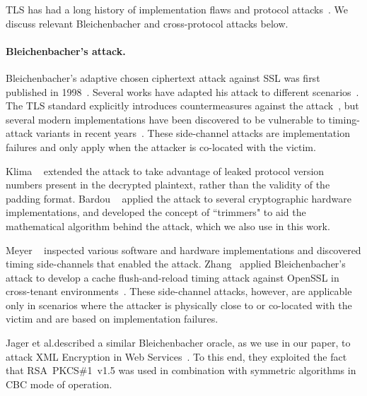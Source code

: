 TLS has had a long history of implementation flaws and protocol attacks~\cite{POODLE,CRIME,RC4biases,Lucky13,BEAST,SLOTH,Durumeric:2014:MH:2663716.2663755}. We discuss relevant Bleichenbacher and cross-protocol attacks below.

\paragraph{Bleichenbacher's attack.}
Bleichenbacher's adaptive chosen ciphertext attack against SSL was first published in 1998~\cite{Bleichenbacher}. Several works have adapted his attack to different scenarios~\cite{klima2003attacking,efficient-padding-oracle-2012,Jager2012}.
The TLS standard explicitly introduces countermeasures against the attack~\cite{rfc5246}, but several modern implementations have been discovered to be vulnerable to timing-attack variants in recent years~\cite{Meyer14,Zhang:2014:CSA:2660267.2660356}. These side-channel attacks are implementation failures and only apply when the attacker is co-located with the victim.

\ifext
Klima \etal~\cite{klima2003attacking} extended the attack to take advantage of leaked protocol version numbers present in the decrypted plaintext, rather than the validity of the padding format.  Bardou \etal~\cite{efficient-padding-oracle-2012} applied the attack to several cryptographic hardware implementations, and developed the concept of ``trimmers" to aid the mathematical algorithm behind the attack, which we also use in this work.
\fi

Meyer \etal~\cite{Meyer14} inspected various software and hardware implementations and discovered timing side-channels that enabled the attack. Zhang  \etal~applied Bleichenbacher's attack to develop a cache flush-and-reload timing attack against OpenSSL in cross-tenant environments~\cite{Zhang:2014:CSA:2660267.2660356}. These side-channel attacks, however, are applicable only in scenarios where the attacker is physically close to or co-located with the victim and are based on implementation failures.

Jager et al.\@ described a similar Bleichenbacher oracle, as we use in our paper, to attack XML Encryption in Web Services~\cite{Jager2012}. To this end, they exploited the fact that RSA~PKCS\#1~v1.5 was used in combination with symmetric algorithms in CBC mode of operation.
\fi

